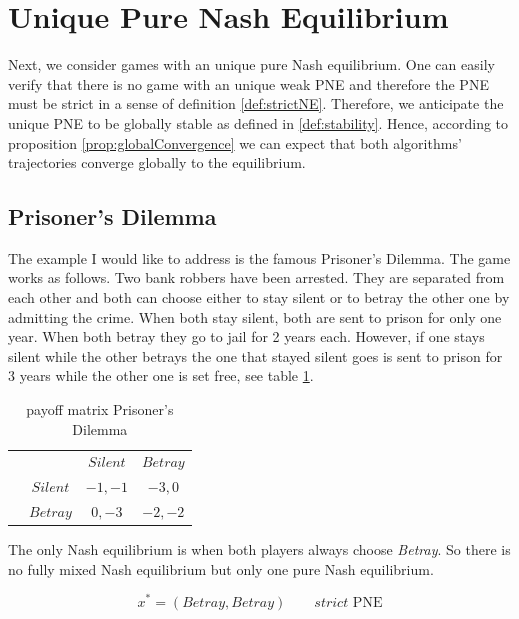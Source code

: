 \section{Unique Pure Nash Equilibrium}\label{section:uniquePureNashEquilibrium}

Next, we consider games with an unique pure Nash equilibrium. One can easily verify that there is no game with an unique weak PNE and therefore the PNE must be strict in a sense of definition \ref{def:strictNE}. Therefore, we anticipate the unique PNE to be globally stable as defined in \ref{def:stability}. Hence, according to proposition \ref{prop:globalConvergence} we can expect that both algorithms' trajectories converge globally to the equilibrium.  

\subsection{Prisoner's Dilemma}\label{subsection:prisonersDilemma}

The example I would like to address is the famous Prisoner's Dilemma. The game works as follows. Two bank robbers have been arrested. They are separated from each other and both can choose either to stay silent or to betray the other one by admitting the crime. When both stay silent, both are sent to prison for only one year. When both betray they go to jail for 2 years each. However, if one stays silent while the other betrays the one that stayed silent goes is sent to prison for 3 years while the other one is set free, see table \ref{tab:payoffPrisoners}.

\begin{table}[H]\centering
\setlength{\extrarowheight}{2pt}
\begin{tabular}{cc|c|c|}
  & \multicolumn{1}{c}{} & \multicolumn{1}{c}{$Silent$}  & \multicolumn{1}{c}{$Betray$} \\\cline{3-4}
  & $Silent$ & $-1,-1$ & $-3,0$ \\\cline{3-4}
  & $Betray$ & $0,-3$ & $-2,-2$ \\\cline{3-4}
\end{tabular}\caption{\label{tab:payoffPrisoners}payoff matrix Prisoner's Dilemma}
\end{table}

The only Nash equilibrium is when both players always choose \textit{Betray}. So there is no fully mixed Nash equilibrium but only one pure Nash equilibrium. 

\begin{equation*}
    x^{*} = (Betray,Betray) \qquad \textit{strict }\text{PNE}
\end{equation*}

